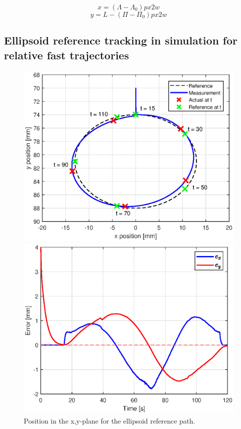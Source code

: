 \begin{equation}
    x = (\Lambda-\Lambda_0)px2w
\end{equation}
\begin{equation}    
    y = L - (\Pi - \Pi_0)px2w 
\end{equation}










\subsection{Ellipsoid reference tracking in simulation for relative fast trajectories}


\begin{figure}[H] 
    \begin{minipage}[b]{0.49\linewidth}
     \centering
    \includegraphics[width=\linewidth]{Figures/Chapter5/ellipsxy.eps} 
    \caption{Position in the x,y-plane for the ellipsoid reference path. } 
    \label{app5:xysim} 
       \end{minipage} 
    \begin{minipage}[b]{0.49\linewidth}
     \centering
    \includegraphics[width=\linewidth]{Figures/Chapter5/errorellips.eps} 

\end{minipage}
\end{figure}

